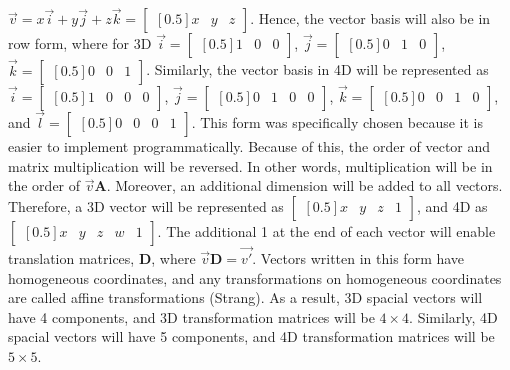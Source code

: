 \documentclass[12pt, letterpaper]{article}
\begin{document}
$\vec{v} = x\vec{i} + y\vec{j} + z\vec{k} = \begin{bmatrix}[0.5]x&y&z\end{bmatrix}$. Hence, the vector basis will also be in row form, where for 3D $\vec{i} = \begin{bmatrix}[0.5]1&0&0\end{bmatrix}$, $\vec{j} = \begin{bmatrix}[0.5]0&1&0\end{bmatrix}$, $\vec{k} = \begin{bmatrix}[0.5]0&0&1\end{bmatrix}$. Similarly, the vector basis in 4D will be represented as $\vec{i} = \begin{bmatrix}[0.5]1&0&0&0\end{bmatrix}$, $\vec{j} = \begin{bmatrix}[0.5]0&1&0&0\end{bmatrix}$, $\vec{k} = \begin{bmatrix}[0.5]0&0&1&0\end{bmatrix}$, and $\vec{l} = \begin{bmatrix}[0.5]0&0&0&1\end{bmatrix}$. This form was specifically chosen because it is easier to implement programmatically. Because of this, the order of vector and matrix multiplication will be reversed. In other words, multiplication will be in the order of $\vec{v} \mathbf{A}$. Moreover, an additional dimension will be added to all vectors. Therefore, a 3D vector will be represented as $\begin{bmatrix}[0.5]x&y&z&1\end{bmatrix}$, and 4D as $\begin{bmatrix}[0.5]x&y&z&w&1\end{bmatrix}$. The additional 1 at the end of each vector will enable translation matrices, $\mathbf{D}$, where $\vec{v}\mathbf{D} = \vec{v'}$. Vectors written in this form have homogeneous coordinates, and any transformations on homogeneous coordinates are called affine transformations (Strang). As a result, 3D spacial vectors will have 4 components, and 3D transformation matrices will be $4 \times 4$. Similarly, 4D spacial vectors will have 5 components, and 4D transformation matrices will be $5 \times 5$.
\end{document}
